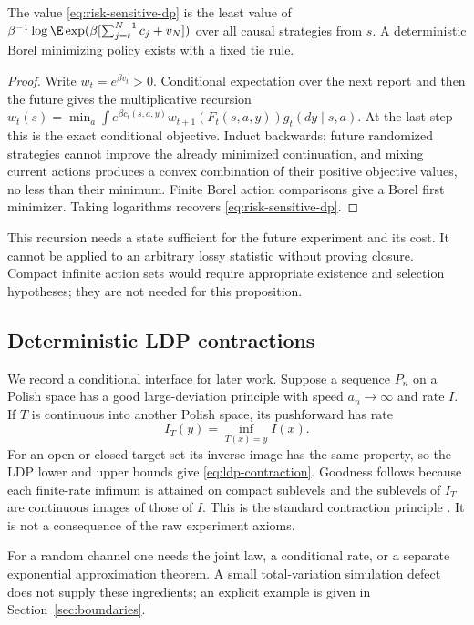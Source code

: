 \begin{proposition}
\label{prop:exp-dp}
The value \eqref{eq:risk-sensitive-dp} is the least value of
$\beta^{-1}\log\E\exp(\beta[\sum_{j=t}^{N-1}c_j+v_N])$
over all causal strategies from $s$. A deterministic Borel minimizing
policy exists with a fixed tie rule.
\end{proposition}
\begin{proof}
Write $w_t=e^{\beta v_t}>0$. Conditional expectation over the next report
and then the future gives the multiplicative recursion
$w_t(s)=\min_a\int e^{\beta c_t(s,a,y)}w_{t+1}(F_t(s,a,y))g_t(dy\mid s,a)$.
At the last step this is the exact conditional objective. Induct backwards;
future randomized strategies cannot improve the already minimized
continuation, and mixing current actions produces a convex combination
of their positive objective values, no less than their minimum. Finite
Borel action comparisons give a Borel first minimizer. Taking logarithms
recovers \eqref{eq:risk-sensitive-dp}.
\end{proof}

This recursion needs a state sufficient for the future experiment and its
cost. It cannot be applied to an arbitrary lossy statistic without proving
closure. Compact infinite action sets would require appropriate existence
and selection hypotheses; they are not needed for this proposition.

\subsection{Deterministic LDP contractions}
We record a conditional interface for later work. Suppose a sequence
$P_n$ on a Polish space has a good large-deviation principle with speed
$a_n\to\infty$ and rate $I$. If $T$ is continuous into another Polish
space, its pushforward has rate
\begin{equation}\label{eq:ldp-contraction}
 I_T(y)=\inf_{T(x)=y}I(x).
\end{equation}
For an open or closed target set its inverse image has the same property,
so the LDP lower and upper bounds give \eqref{eq:ldp-contraction}.
Goodness follows because each finite-rate infimum is attained on compact
sublevels and the sublevels of $I_T$ are continuous images of those of
$I$. This is the standard contraction principle
\cite{VaradhanNotes}. It is not a consequence of the raw experiment axioms.

For a random channel one needs the joint law, a conditional rate, or a
separate exponential approximation theorem. A small total-variation
simulation defect does not supply these ingredients; an explicit example
is given in Section~\ref{sec:boundaries}.

